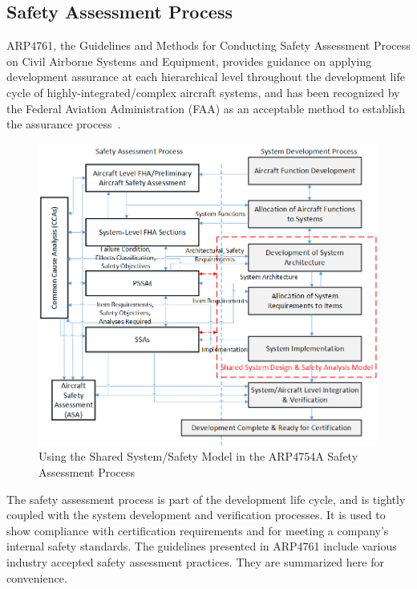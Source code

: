 \subsection{Safety Assessment Process}
\label{subsec:process}

ARP4761, the Guidelines and Methods for Conducting Safety Assessment Process on Civil Airborne Systems and Equipment, provides guidance on applying development assurance at each hierarchical level throughout the development life cycle of highly-integrated/complex aircraft systems, and has been recognized by the Federal Aviation Administration (FAA) as an acceptable method to establish the assurance process~\cite{SAE:ARP4761}.

\begin{figure}[h!]
	\centering
	\includegraphics[width=1.0\textwidth]{images/Safety_Assessment_Process.png}
	\caption{Using the Shared System/Safety Model in the ARP4754A Safety Assessment Process}
	\label{fig:proposed_safety_process}
\end{figure}

The safety assessment process is part of the development life cycle, and is tightly coupled with the system development and verification processes. It is used to show compliance with certification requirements and for meeting a company's internal safety standards. The guidelines presented in ARP4761 include various industry accepted safety assessment practices. They are summarized here for convenience. 

